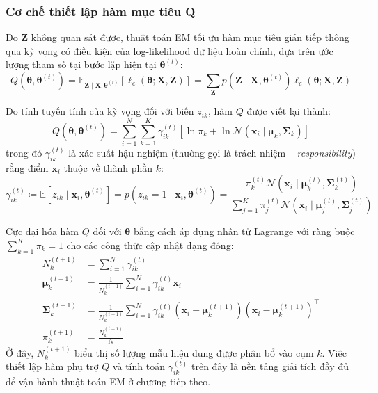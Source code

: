 \documentclass[12pt,a4paper]{article}
\newcommand{\vx}{\mathbf{x}}
\newcommand{\vmu}{\boldsymbol{\mu}}
\newcommand{\vSigma}{\boldsymbol{\Sigma}}
\newcommand{\vtheta}{\boldsymbol{\theta}}
\newcommand{\bX}{\mathbf{X}}
\newcommand{\bZ}{\mathbf{Z}}
\newcommand{\Normal}{\mathcal{N}}
\newcommand{\Exp}{\mathbb{E}}
\newcommand{\responsibility}{\gamma}
\newcommand{\Nk}{N_k}
\begin{document}
\subsubsection{Cơ chế thiết lập hàm mục tiêu Q}

Do $\bZ$ không quan sát được, thuật toán EM tối ưu hàm mục tiêu gián tiếp thông qua kỳ vọng có điều kiện của log-likelihood dữ liệu hoàn chỉnh, dựa trên ước lượng tham số tại bước lặp hiện tại $\vtheta^{(t)}$:
\begin{equation}
    Q(\vtheta, \vtheta^{(t)}) = \Exp_{\bZ \mid \bX, \vtheta^{(t)}} \left[ \ell_c(\vtheta ; \bX, \bZ) \right] = \sum_{\bZ} p(\bZ \mid \bX, \vtheta^{(t)}) \ell_c(\vtheta ; \bX, \bZ)
\end{equation}

Do tính tuyến tính của kỳ vọng đối với biến $z_{ik}$, hàm $Q$ được viết lại thành:
\begin{equation}
    Q(\vtheta, \vtheta^{(t)}) = \sum_{i=1}^N \sum_{k=1}^K \responsibility_{ik}^{(t)} \left[ \ln \pi_k + \ln \Normal(\vx_i \mid \vmu_k, \vSigma_k) \right] \label{eq:q_explicit}
\end{equation}
trong đó $\responsibility_{ik}^{(t)}$ là xác suất hậu nghiệm (thường gọi là trách nhiệm -- \textit{responsibility}) rằng điểm $\vx_i$ thuộc về thành phần $k$:
\begin{equation}
    \responsibility_{ik}^{(t)} \coloneqq \Exp[z_{ik} \mid \vx_i, \vtheta^{(t)}] = p(z_{ik} = 1 \mid \vx_i, \vtheta^{(t)}) = \frac{\pi_k^{(t)} \Normal(\vx_i \mid \vmu_k^{(t)}, \vSigma_k^{(t)})}{\sum_{j=1}^K \pi_j^{(t)} \Normal(\vx_i \mid \vmu_j^{(t)}, \vSigma_j^{(t)})}
\end{equation}

Cực đại hóa hàm $Q$ đối với $\vtheta$ bằng cách áp dụng nhân tử Lagrange với ràng buộc $\sum_{k=1}^K \pi_k = 1$ cho các công thức cập nhật dạng đóng:
\begin{align}
    \Nk^{(t+1)} &= \sum_{i=1}^N \responsibility_{ik}^{(t)} \label{eq:effective_n} \\
    \vmu_k^{(t+1)} &= \frac{1}{\Nk^{(t+1)}} \sum_{i=1}^N \responsibility_{ik}^{(t)} \vx_i \label{eq:mu_update} \\
    \vSigma_k^{(t+1)} &= \frac{1}{\Nk^{(t+1)}} \sum_{i=1}^N \responsibility_{ik}^{(t)} (\vx_i - \vmu_k^{(t+1)})(\vx_i - \vmu_k^{(t+1)})^\top \label{eq:sigma_update} \\
    \pi_k^{(t+1)} &= \frac{\Nk^{(t+1)}}{N} \label{eq:pi_update}
\end{align}
Ở đây, $\Nk^{(t+1)}$ biểu thị số lượng mẫu hiệu dụng được phân bổ vào cụm $k$. Việc thiết lập hàm phụ trợ $Q$ và tính toán $\responsibility_{ik}^{(t)}$ trên đây là nền tảng giải tích đầy đủ để vận hành thuật toán EM ở chương tiếp theo.
\end{document}
